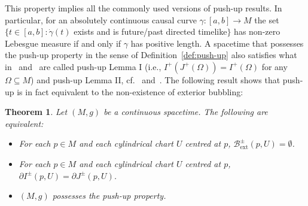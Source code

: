 \documentclass[reqno]{amsart}
\numberwithin{equation}{section}
\theoremstyle{plain}
\newtheorem{theorem}{Theorem}[section]
\theoremstyle{definition}
\theoremstyle{remark}
\newcommand{\sse}{\subseteq}
\begin{document}
This property implies all the commonly used versions of push-up results. In particular, for an absolutely continuous causal curve 
$\gamma \colon [a,b]\rightarrow M$ the set $\{t \in [a,b]: \dot\gamma(t)$ exists and is future/past directed timelike$\}$ has non-zero 
Lebesgue measure if and only if $\gamma$ has positive length. A spacetime that possesses the push-up property in the sense of Definition~\ref{def:push-up} also satisfies what 
in~\cite[Lemma~2.4.14]{Chr:11} and~\cite[Lemma~1.22]{CG:12} are called
push-up Lemma I (i.e., $I^+(J^+(\Omega)) = I^+(\Omega)$ for any $\Omega\sse M$) and push-up Lemma II, cf.~\cite[Lemma~2.9.10]{Chr:11} and~\cite[Lemma 1.24]{CG:12}. The following result shows that push-up is in fact equivalent to the non-existence
of exterior bubbling:
\begin{theorem}\label{thm:push-up_ext_bubble}
Let $(M,g)$ be a continuous spacetime. The following are equivalent:
\begin{itemize}
\item[(i)] For each $p\in M$ and each cylindrical chart $U$ centred at $p$, $\mathcal{B}^\pm_{\mathrm{ext}}(p,U)=\emptyset$.
\item[(ii)] For each $p\in M$ and each cylindrical chart $U$ centred at $p$, 
$\partial I^\pm(p,U) = \partial J^\pm(p,U)$.
\item[(iii)] $(M,g)$ possesses the push-up property. 
\end{itemize}	
\end{theorem}
\end{document}
